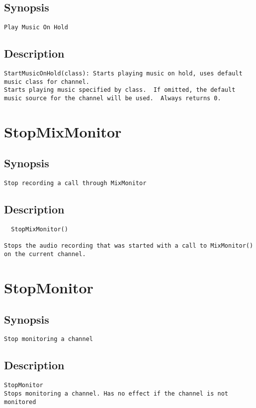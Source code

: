\subsection{Synopsis}
\begin{verbatim}
Play Music On Hold
\end{verbatim}
\subsection{Description}
\begin{verbatim}
StartMusicOnHold(class): Starts playing music on hold, uses default music class for channel.
Starts playing music specified by class.  If omitted, the default
music source for the channel will be used.  Always returns 0.

\end{verbatim}


\section{StopMixMonitor}
\subsection{Synopsis}
\begin{verbatim}
Stop recording a call through MixMonitor
\end{verbatim}
\subsection{Description}
\begin{verbatim}
  StopMixMonitor()

Stops the audio recording that was started with a call to MixMonitor()
on the current channel.

\end{verbatim}


\section{StopMonitor}
\subsection{Synopsis}
\begin{verbatim}
Stop monitoring a channel
\end{verbatim}
\subsection{Description}
\begin{verbatim}
StopMonitor
Stops monitoring a channel. Has no effect if the channel is not monitored

\end{verbatim}


